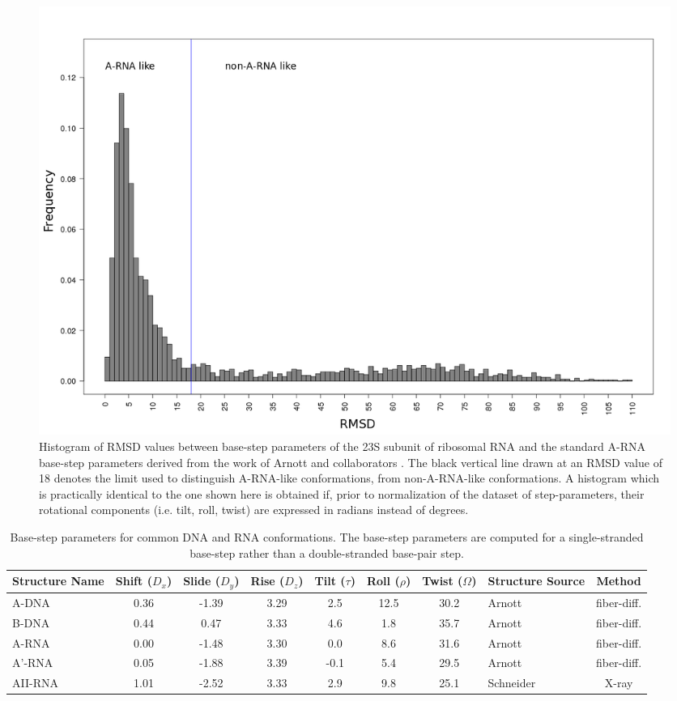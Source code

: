 \begin{figure}[ht]
 \centering
\includegraphics[angle=0, scale=0.38]{Chapter2/dormsd.png}
\caption{Histogram of RMSD values  between base-step parameters of the
  23S  subunit  of ribosomal  RNA  and  the  standard A-RNA  base-step
  parameters  derived  from  the  work  of  Arnott  and  collaborators
  \cite{arnott1973}. The black vertical line drawn at an RMSD value of
  18 denotes  the limit used to  distinguish A-RNA-like conformations,
  from non-A-RNA-like conformations.  A histogram which is practically
  identical  to  the   one  shown  here  is  obtained   if,  prior  to
  normalization  of the dataset  of step-parameters,  their rotational
  components (i.e. tilt, roll, twist) are expressed in radians instead
  of degrees.}
\label{fig:dormsd}
\end{figure}

\begin{table}[ht]
\centering
\small\addtolength{\tabcolsep}{-2pt}
\begin{tabular}{p{1.4cm}|c|c|c|c|c|c|p{2.2cm}|c}
\hline
\textbf{Structure Name} & Shift ($D_x$) & Slide ($D_y$) & Rise ($D_z$) & Tilt
($\tau$) & Roll ($\rho$) & Twist ($\Omega$) & \textbf{Structure Source} &
\textbf{Method} \\ \hline
A-DNA & 0.36 & -1.39 & 3.29 & 2.5 & 12.5 & 30.2 & Arnott
\cite{arnott1999} & fiber-diff. \\ \hline
B-DNA & 0.44 & 0.47 & 3.33 & 4.6 & 1.8 & 35.7   & Arnott
\cite{arnott1999} & fiber-diff. \\ \hline
A-RNA & 0.00 & -1.48 & 3.30 & 0.0 & 8.6 & 31.6 & Arnott
\cite{arnott1999} & fiber-diff. \\ \hline
A'-RNA & 0.05 & -1.88 & 3.39 & -0.1 & 5.4 & 29.5 & Arnott
\cite{arnott1999} & fiber-diff. \\ \hline
AII-RNA & 1.01 & -2.52 & 3.33 & 2.9 & 9.8 & 25.1 & Schneider
\cite{schneider2004} & X-ray \\ \hline
\end{tabular}
\caption{Base-step   parameters    for   common    DNA    and   RNA
  conformations.   The  base-step  parameters   are  computed   for  a
  single-stranded  base-step rather  than a  double-stranded base-pair
  step.}
\label{tab:conf}
\end{table}

